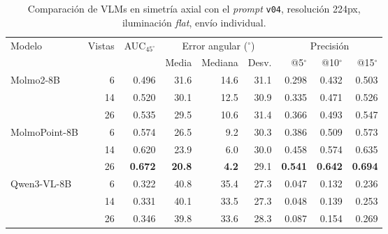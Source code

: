 \begin{table}[H]
\centering
\caption{Comparación de VLMs en simetría axial con el \textit{prompt} \texttt{v04}, resolución 224px, iluminación \textit{flat}, envío individual.}
\label{tab:nov_axis_vlms}
\footnotesize
\setlength{\tabcolsep}{3pt}
\renewcommand{\arraystretch}{0.95}

\begin{tabular*}{\textwidth}{@{\extracolsep{\fill}}lrrrrrrrr@{}}
\toprule
\multirow{2}{*}{Modelo} & \multirow{2}{*}{Vistas} & \multirow{2}{*}{AUC$_{45^\circ}$} & \multicolumn{3}{c}{Error angular ($^\circ$)} & \multicolumn{3}{c}{Precisión} \\
\cmidrule(lr){4-6} \cmidrule(lr){7-9}
 &  &  & Media & Mediana & Desv. & @5$^\circ$ & @10$^\circ$ & @15$^\circ$ \\
\midrule
\multirow{3}{*}{Molmo2-8B} & 6 & 0.496 & 31.6 & 14.6 & 31.1 & 0.298 & 0.432 & 0.503 \\
 & 14 & 0.520 & 30.1 & 12.5 & 30.9 & 0.335 & 0.471 & 0.526 \\
 & 26 & 0.535 & 29.5 & 10.6 & 31.4 & 0.366 & 0.493 & 0.547 \\
\midrule
\multirow{3}{*}{MolmoPoint-8B} & 6 & 0.574 & 26.5 & 9.2 & 30.3 & 0.386 & 0.509 & 0.573 \\
 & 14 & 0.620 & 23.9 & 6.0 & 30.0 & 0.458 & 0.574 & 0.635 \\
 & 26 & \textbf{0.672} & \textbf{20.8} & \textbf{4.2} & 29.1 & \textbf{0.541} & \textbf{0.642} & \textbf{0.694} \\
\midrule
\multirow{3}{*}{Qwen3-VL-8B} & 6 & 0.322 & 40.8 & 35.4 & 27.3 & 0.047 & 0.132 & 0.236 \\
 & 14 & 0.331 & 40.1 & 33.5 & 27.3 & 0.048 & 0.139 & 0.253 \\
 & 26 & 0.346 & 39.8 & 33.6 & 28.3 & 0.087 & 0.154 & 0.269 \\
\bottomrule
\end{tabular*}

\vspace{2ex}


\end{table}
